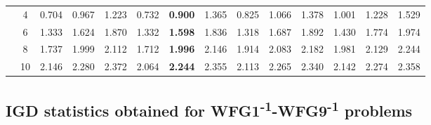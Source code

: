 \documentclass[onecolumn,10pt]{asme2ej}
\begin{document}
\begin{table}[!htb]
\begin{tabular}{|c|c|c|c|c|c|c|c|c|c|c|c|c|c|}
		& 4          & 0.704         & 0.967            & 1.223          & 0.732         & \textbf{0.900}    & 1.365          & 0.825         & 1.066         & 1.378          & 1.001         & 1.228             & 1.529          \\ \cline{2-14} 
		& 6          & 1.333         & 1.624            & 1.870          & 1.332         & \textbf{1.598}    & 1.836          & 1.318         & 1.687         & 1.892          & 1.430         & 1.774             & 1.974          \\ \cline{2-14} 
		& 8          & 1.737         & 1.999            & 2.112          & 1.712         & \textbf{1.996}    & 2.146          & 1.914         & 2.083         & 2.182          & 1.981         & 2.129             & 2.244          \\ \cline{2-14} 
		& 10         & 2.146         & 2.280            & 2.372          & 2.064         & \textbf{2.244}    & 2.355          & 2.113         & 2.265         & 2.340          & 2.142         & 2.274             & 2.358          \\ \hline
	\end{tabular}
\end{table}

\clearpage

\subsection{IGD statistics obtained for WFG1\textsuperscript{-1}-WFG9\textsuperscript{-1} problems}
\end{document}
